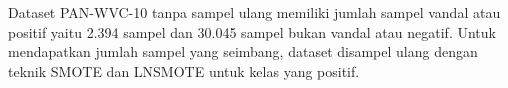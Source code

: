 Dataset PAN-WVC-10 tanpa sampel ulang memiliki jumlah sampel vandal atau
positif yaitu 2.394 sampel dan 30.045 sampel bukan vandal atau negatif.
Untuk mendapatkan jumlah sampel yang seimbang, dataset disampel ulang dengan
teknik SMOTE dan LNSMOTE untuk kelas yang positif.
